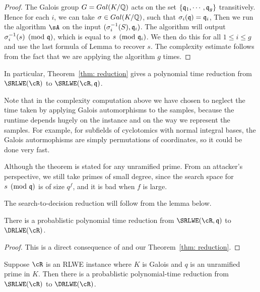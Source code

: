 \documentclass{amsart}
\begin{document}
\begin{proof}
The Galois group $G =Gal(K/\mathbb{Q})$ acts on the set $\{\mathfrak{q}_1, \cdots ,\mathfrak{q}_g\}$ transitively. Hence for each $i$, we can take $\sigma \in Gal(K/\mathbb{Q})$, such that $\sigma_i(\mathfrak{q}) = \mathfrak{q}_i$, Then we run the algorithm $\sA$ on the input $(\sigma_i^{-1}(S), \mathfrak{q}_i)$. The algorithm will output $\sigma_i^{-1}(s) \pmod{\mathfrak{q}}$, which is equal to $s \pmod{\mathfrak{q}_i}$. We then do this for all $1\leq i \leq g$ and use the last formula of Lemma to recover $s$. The complexity estimate follows from the fact that we are applying the algorithm $g$ times.
\end{proof}

In particular, Theorem~\ref{thm: reduction} gives a polynomial time reduction from $\SRLWE(\cR)$ to $\SRLWE(\cR,\fq)$.

\begin{remark}
Note that in the complexity computation above we have chosen to neglect the time taken by applying Galois automorphisms to the samples, because the runtime depends
hugely on the instance and on the way we represent the samples. For example, for subfields of cyclotomics with normal integral bases, the Galois autormophisms are simply permutations of coordinates, so it could be done very fast.
\end{remark}

\begin{remark}
Although the theorem is stated for any unramified prime. From an attacker's perspective, we still take primes of small degree, since the search space for $s \pmod{\mathfrak{q}}$ is of size $q^f$, and it is bad when $f$ is large.
\end{remark}

The search-to-decision reduction will follow from the lemma below.
\begin{Lemma}
There is a probablistic polynomial time reduction from $\SRLWE(\cR,\fq)$ to $\DRLWE(\cR)$.
\end{Lemma}

\begin{proof}
This is a direct consequence of \cite[Lemma 5.9 and Lemma 5.12 ]{lyubashevsky2013ideal} and our Theorem~\ref{thm: reduction}.
\end{proof}

\begin{Corollary}
Suppose $\cR$ is an RLWE instance where $K$ is Galois and $q$ is an unramified prime in $K$. Then there is a probablistic polynomial-time reduction from $\SRLWE(\cR)$ to $\DRLWE(\cR)$.
\end{Corollary}
\end{document}
